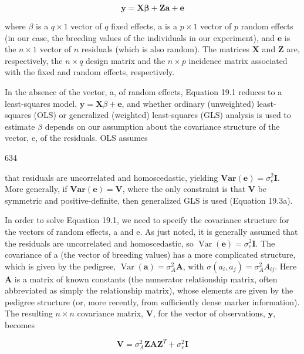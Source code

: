 \documentclass{article}
\begin{document}
\begin{equation}
\mathbf{y}=\mathbf{X}\boldsymbol{\beta}+\mathbf{Z}\mathbf{a}+\mathbf{e}
\tag{19.1}
\label{eq:19_1}
\end{equation}

where  $ \beta $ is a  $ q \times 1 $ vector of  $ q $ fixed effects, a is a  $ p \times 1 $ vector of  $ p $ random effects (in our case, the breeding values of the individuals in our experiment), and  $ \mathbf{e} $ is the  $ n \times 1 $ vector of  $ n $ residuals (which is also random). The matrices  $ \mathbf{X} $ and  $ \mathbf{Z} $ are, respectively, the  $ n \times q $ design matrix and the  $ n \times p $ incidence matrix associated with the fixed and random effects, respectively.

In the absence of the vector, a, of random effects, Equation 19.1 reduces to a least-squares model,  $ \mathbf{y} = \mathbf{X}\beta + \mathbf{e} $, and whether ordinary (unweighted) least-squares (OLS) or generalized (weighted) least-squares (GLS) analysis is used to estimate  $ \beta $ depends on our assumption about the covariance structure of the vector, e, of the residuals. OLS assumes

634

that residuals are uncorrelated and homoscedastic, yielding  $ \mathbf{Var}(\mathbf{e}) = \sigma_e^2 \mathbf{I} $. More generally, if  $ \mathbf{Var}(\mathbf{e}) = \mathbf{V} $, where the only constraint is that  $ \mathbf{V} $ be symmetric and positive-definite, then generalized GLS is used (Equation 19.3a).

In order to solve Equation 19.1, we need to specify the covariance structure for the vectors of random effects, a and e. As just noted, it is generally assumed that the residuals are uncorrelated and homoscedastic, so  $ \operatorname{Var}(\mathbf{e}) = \sigma_e^2 \mathbf{I} $. The covariance of a (the vector of breeding values) has a more complicated structure, which is given by the pedigree,  $ \operatorname{Var}(\mathbf{a}) = \sigma_A^2 \mathbf{A} $, with  $ \sigma(a_i, a_j) = \sigma_A^2 A_{ij} $. Here  $ \mathbf{A} $ is a matrix of known constants (the numerator relationship matrix, often abbreviated as simply the relationship matrix), whose elements are given by the pedigree structure (or, more recently, from sufficiently dense marker information). The resulting  $ n \times n $ covariance matrix,  $ \mathbf{V} $, for the vector of observations,  $ \mathbf{y} $, becomes

\begin{equation}
\mathbf{V}=\sigma_{A}^{2}\mathbf{Z}\mathbf{A}\mathbf{Z}^{T}+\sigma_{e}^{2}\mathbf{I}
\tag{19.2a}
\label{eq:19_2a}
\end{equation}
\end{document}
